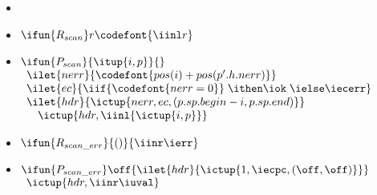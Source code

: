 \begin{itemize}
\item %
\item $\ifun{R_{scan}} r  {\codefont{\iinl r}}$
\item $\ifun{P_{scan}} {\itup{i,p}} {}$ \\
$\begin{array}{l}
\ilet {nerr} {\codefont{pos(i) + pos(p'.h.nerr)}}\\
\ilet {ec} {\iif {\codefont{nerr = 0}}\; \ithen \iok\; \ielse \iecerr} \\
\ilet {hdr} {\ictup{nerr,ec,(p.sp.begin - i,p.sp.end)}} \\
\quad \ictup{hdr,\iinl {\ictup{i,p}}}
\end{array}$

\item $\ifun {R_{scan\_err}} {()} {\iinr \ierr}$
\item $\ifun {P_{scan\_err}} \off {\ilet {hdr} {\ictup{1,\iecpc,(\off,\off)}}}$\\
  \verb+ +$\ictup{hdr,\iinr \iuval}$
\end{itemize}

